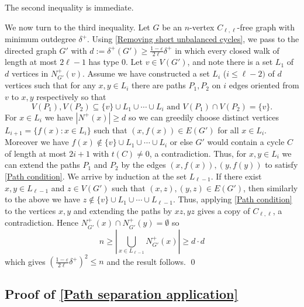 \documentclass[12pt]{article}
\begin{document}
The second inequality is immediate.

We now turn to the third inequality. Let $G$ be an $n$-vertex $C_{\ell,\ell}$-free graph with minimum outdegree $\delta^+$. Using \autoref{Removing short unbalanced cycles}, we pass to the directed graph $G'$ with $d:=\delta^+(G')\ge\frac{1-\varepsilon}{2\ell}\delta^+$ in which every closed walk of length at most $2\ell-1$ has type 0. Let $v\in V(G')$, and note there is a set $L_1$ of $d$ vertices in $N_{G'}^+(v)$. Assume we have constructed a set $L_i$ ($i\le\ell-2)$ of $d$ vertices such that
    for any $x,y\in L_i$ there are paths $P_1,P_2$ on $i$ edges oriented from $v$ to $x,y$ respectively so that 
    \begin{equation} \label{Path condition}
    V(P_1),V(P_2)\subseteq\{v\}\cup L_1\cup\cdots\cup L_{i}\text{ and }V(P_1)\cap V(P_2)=\{v\}.
    \end{equation}
    For $x\in L_i$ we have $|N^+(x)|\ge d$ so we can greedily choose distinct vertices $L_{i+1}=\{f(x):x\in L_i\}$ such that $(x,f(x))\in E(G')$ for all $x\in L_i$. Moreover we have $f(x)\not\in \{v\}\cup L_1\cup\cdots\cup L_i$ or else $G'$ would contain a cycle $C$ of length at most $2i+1$ with $t(C)\ne 0$, a contradiction. Thus, for $x,y\in L_i$ we can extend the paths $P_1$ and $P_2$ by the edges $(x,f(x)),(y,f(y))$ to satisfy \autoref{Path condition}. We arrive by induction at the set $L_{\ell-1}$. If there exist $x,y\in L_{\ell-1}$ and $z\in V(G')$ such that $(x,z),(y,z)\in E(G')$, then similarly to the above we have $z\not\in\{v\}\cup L_1\cup\cdots\cup L_{\ell-1}$. Thus, applying \autoref{Path condition} to the vertices $x,y$ and extending the paths by $xz,yz$ gives a copy of $C_{\ell,\ell}$, a contradiction. Hence $N^+_{G'}(x)\cap N_{G'}^+(y)=\emptyset$ so 
    $$n\ge\left|\bigcup_{x\in L_{\ell-1}}N_{G'}^+(x)\right|\ge d\cdot d$$
    which gives 
    $\left(\frac{1-\varepsilon}{2\ell}\delta^+\right)^2\le n$ and the result follows.
\qed

\subsection{Proof of \autoref{Path separation application}}
\end{document}

